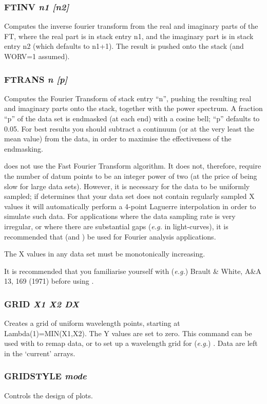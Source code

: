 \documentclass[twoside,11pt,noabs,nolof]{starlink}
\providecommand{\dipcom}[3]{\subsubsection*{\label{COM:#1}\xlabel{COM:#1}\textbf{#1} \emph{#2}}}
\begin{document}
\dipcom{FTINV}{n1 [n2]}{Takes the inverse Fourier transform of two stack entries}
Computes the inverse fourier transform from the real and imaginary
parts of the FT, where the real part is in stack entry n1, and the
imaginary part is in stack entry n2 (which defaults to n1+1). The
result is pushed onto the stack (and WORV=1 assumed).

\dipcom{FTRANS}{n [p]}{Takes the forward Fourier transform of a stack entry}
Computes the Fourier Transform of stack entry ``n'', pushing the
resulting real and imaginary parts onto the stack, together with the
power spectrum. A fraction ``p'' of the data set is endmasked (at each
end) with a cosine bell; ``p'' defaults to 0.05. For best results you
should subtract a continuum (or at the very least the mean value) from
the data, in order to maximise the effectiveness of the endmasking.

  does not use the Fast Fourier Transform algorithm. It does not,
therefore, require the number of datum points to be an integer power
of two (at the price of being slow for large data sets). However, it is
necessary for the data to be uniformly sampled; if   determines
that your data set does not contain regularly sampled X values it will
automatically perform a 4-point Laguerre interpolation in order to
simulate such data. For applications where the data sampling rate is
very irregular, or where there are substantial gaps (\emph{e.g.} in
light-curves), it is recommended that   (and )  be used
for Fourier analysis applications.

The X values in any data set must be monotonically increasing.

It is recommended that you familiarise yourself with (\emph{e.g.})
Brault \& White, A\&A 13, 169 (1971) before using .

\dipcom{GRID}{X1 X2 DX}{Creates an array of uniform wavelength values with zero Y values}
Creates a grid of uniform wavelength points, starting at
Lambda(1)=MIN(X1,X2). The Y values are set to zero. This command can
be used with   to remap data, or to set up a wavelength grid for
(\emph{e.g.}) .  Data are left in the `current' arrays.

\dipcom{GRIDSTYLE}{mode}{Controls the axes, grids and labels used to produce a plot}
Controls the design of plots.
\end{document}
